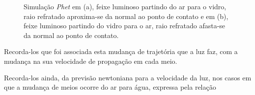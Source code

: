     \vspace*{10pt}
    \begin{figure}[!ht]        
        \centering              
        \hfill
        \caption{Simulação \emph{Phet} em (a), feixe luminoso partindo do ar para o vidro, raio refratado aproxima-se da normal ao ponto de contato e em (b), feixe luminoso partindo do vidro para o ar, raio refratado afasta-se da normal ao ponto de contato.}
        \label{fig:phet-a}
    \end{figure}
    \vspace*{10pt}

    Recorda-los que foi associada esta mudança de trajetória que a luz faz, com a mudança na sua velocidade de propagação em cada meio.

    Recorda-los ainda, da previsão newtoniana para a velocidade da luz, nos casos em que a mudança de meios ocorre do ar para água, expressa pela relação

